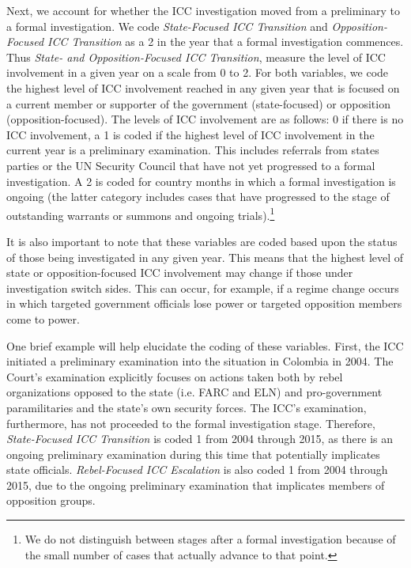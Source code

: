 Next, we account for whether the ICC investigation moved from a preliminary to a formal investigation. We code \emph{State-Focused ICC Transition} and \emph{Opposition-Focused ICC Transition} as a 2 in the year that a formal investigation commences. Thus \emph{State- and Opposition-Focused ICC Transition}, measure the level of ICC involvement in a given year on a scale from 0 to 2. For both variables, we code the highest level of ICC involvement reached in any given year that is focused on a current member or supporter of the government (state-focused) or opposition (opposition-focused). The levels of ICC involvement are as follows: 0 if there is no ICC involvement, a 1 is coded if the highest level of ICC involvement in the current year is a preliminary examination. This includes referrals from states parties or the UN Security Council that have not yet progressed to a formal investigation. A 2 is coded for country months in which a formal investigation is ongoing (the latter category includes cases that have progressed to the stage of outstanding warrants or summons and ongoing trials).\footnote{We do not distinguish between stages after a formal investigation because of the small number of cases that actually advance to that point.}

It is also important to note that these variables are coded based upon the status of those being investigated in any given year. This means that the highest level of state or opposition-focused ICC involvement may change if those under investigation switch sides. This can occur, for example, if a regime change occurs in which targeted government officials lose power or targeted opposition members come to power.

One brief example will help elucidate the coding of these variables. First, the ICC initiated a preliminary examination into the situation in Colombia in 2004. The Court's examination explicitly focuses on actions taken both by rebel organizations opposed to the state (i.e. FARC and ELN) and pro-government paramilitaries and the state's own security forces. The ICC's examination, furthermore, has not proceeded to the formal investigation stage. Therefore, \emph{State-Focused ICC Transition} is coded 1 from 2004 through 2015, as there is an ongoing preliminary examination during this time that potentially implicates state officials. \emph{Rebel-Focused ICC Escalation} is also coded 1 from 2004 through 2015, due to the ongoing preliminary examination that implicates members of opposition groups.

